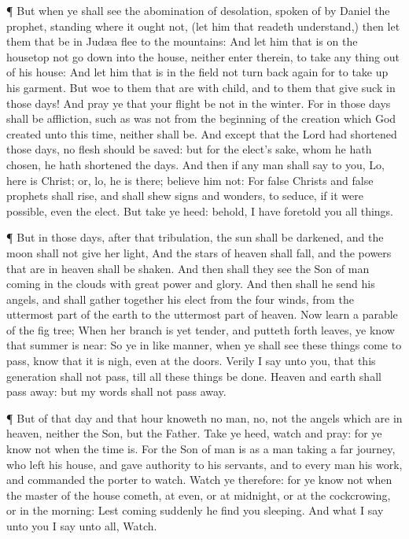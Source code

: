  ¶ But when ye shall see the abomination of desolation,
spoken of by Daniel the prophet, standing where it ought not, (let him
that readeth understand,) then let them that be in Judæa flee to the
mountains:  And let him that is on the housetop not go down
into the house, neither enter therein, to take any thing out of his
house:  And let him that is in the field not turn back
again for to take up his garment.  But woe to them that are
with child, and to them that give suck in those days!  And
pray ye that your flight be not in the winter.  For in
those days shall be affliction, such as was not from the beginning of
the creation which God created unto this time, neither shall be.
 And except that the Lord had shortened those days, no
flesh should be saved: but for the elect's sake, whom he hath chosen, he
hath shortened the days.  And then if any man shall say to
you, Lo, here is Christ; or, lo, he is there; believe him not:
 For false Christs and false prophets shall rise, and shall
shew signs and wonders, to seduce, if it were possible, even the elect.
 But take ye heed: behold, I have foretold you all things.

 ¶ But in those days, after that tribulation, the sun shall
be darkened, and the moon shall not give her light,  And
the stars of heaven shall fall, and the powers that are in heaven shall
be shaken.  And then shall they see the Son of man coming
in the clouds with great power and glory.  And then shall
he send his angels, and shall gather together his elect from the four
winds, from the uttermost part of the earth to the uttermost part of
heaven.  Now learn a parable of the fig tree; When her
branch is yet tender, and putteth forth leaves, ye know that summer is
near:  So ye in like manner, when ye shall see these things
come to pass, know that it is nigh, even at the doors. 
Verily I say unto you, that this generation shall not pass, till all
these things be done.  Heaven and earth shall pass away:
but my words shall not pass away.

 ¶ But of that day and that hour knoweth no man, no, not
the angels which are in heaven, neither the Son, but the Father.
 Take ye heed, watch and pray: for ye know not when the
time is.  For the Son of man is as a man taking a far
journey, who left his house, and gave authority to his servants, and to
every man his work, and commanded the porter to watch. 
Watch ye therefore: for ye know not when the master of the house cometh,
at even, or at midnight, or at the cockcrowing, or in the morning:
 Lest coming suddenly he find you sleeping. 
And what I say unto you I say unto all, Watch.

